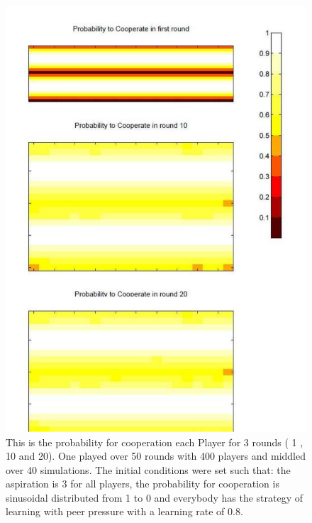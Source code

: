 \documentclass[11pt]{article}
\begin{document}
\begin{figure}
\centering
\includegraphics[scale=0.4]{ProbabilityToCooperateInDiffRound19.pdf}
\caption[]{This is the probability for cooperation each Player for 3 rounds ( 1 , 10 and 20). One played over 50 rounds with 400 players and middled over 40 simulations. The initial conditions were set such that: the aspiration is 3 for all players, the probability for cooperation is sinusoidal distributed from 1 to 0 and everybody has the strategy of learning with peer pressure  with a learning rate of 0.8. }
\label{exp19}
\end{figure}
\end{document}

